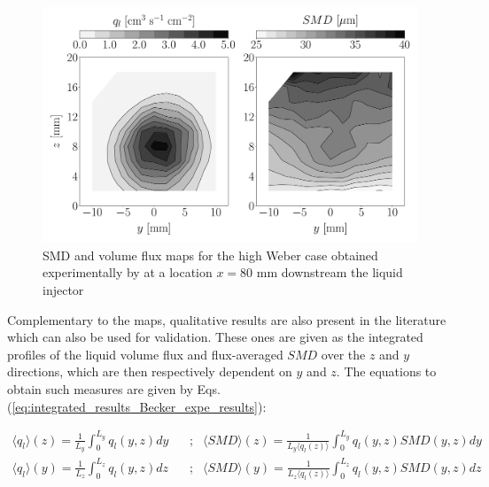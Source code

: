 \begin{figure}[h!]
\centering
   \includegraphics[scale=0.19]{./part2_developments/figures_ch6_lagrangian_JICF/expe_results/maps_UG100}
\caption{SMD and volume flux maps for the high Weber case obtained experimentally by  at a location $x = 80$ mm downstream the liquid injector}
\label{fig:maps_Becker_expe_results}
\end{figure}

Complementary to the maps, qualitative results are also present in the literature which can also be used for validation. These ones are given as the integrated profiles of the liquid volume flux and flux-averaged $SMD$ over the $z$ and $y$ directions, which are then respectively dependent on $y$ and $z$. The equations to obtain such measures are given by Eqs. (\ref{eq:integrated_results_Becker_expe_results}):


\begin{subequations}
\label{eq:integrated_results_Becker_expe_results}
\begin{align}
\langle q_l \rangle \left( z \right)  = \frac{1}{L_y} \int_0^{L_y} q_l \left( y, z \right) dy    & ~~~~  ; & \langle SMD \rangle \left( z \right) = \frac{1}{L_y \langle q_l \left( z \right) \rangle} \int_0^{L_y} q_l \left( y, z \right) SMD \left( y, z \right) dy \\
\langle q_l  \rangle \left( y \right) = \frac{1}{L_z} \int_0^{L_z} q_l \left( y, z \right) dz    & ~~~~  ; & \langle SMD \rangle  \left( y \right)  =  \frac{1}{L_z \langle q_l \left( z \right) \rangle} \int_0^{L_z} q_l \left( y, z \right) SMD \left( y, z \right) dz
\end{align}
\end{subequations}



